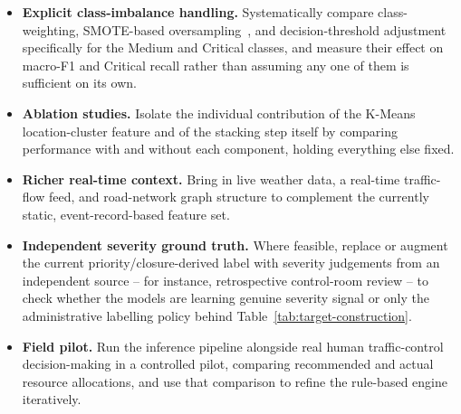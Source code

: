 \begin{itemize}
\item \textbf{Explicit class-imbalance handling.} Systematically compare class-weighting, SMOTE-based oversampling~\cite{chawla2002smote}, and decision-threshold adjustment specifically for the Medium and Critical classes, and measure their effect on macro-F1 and Critical recall rather than assuming any one of them is sufficient on its own.
\item \textbf{Ablation studies.} Isolate the individual contribution of the K-Means location-cluster feature and of the stacking step itself by comparing performance with and without each component, holding everything else fixed.
\item \textbf{Richer real-time context.} Bring in live weather data, a real-time traffic-flow feed, and road-network graph structure to complement the currently static, event-record-based feature set.
\item \textbf{Independent severity ground truth.} Where feasible, replace or augment the current priority/closure-derived label with severity judgements from an independent source -- for instance, retrospective control-room review -- to check whether the models are learning genuine severity signal or only the administrative labelling policy behind Table~\ref{tab:target-construction}.
\item \textbf{Field pilot.} Run the inference pipeline alongside real human traffic-control decision-making in a controlled pilot, comparing recommended and actual resource allocations, and use that comparison to refine the rule-based engine iteratively.
\end{itemize}
